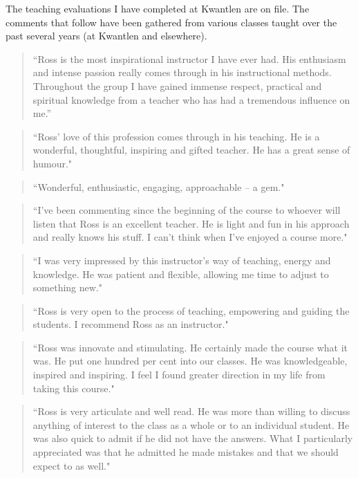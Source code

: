 \documentclass[10pt,DIV09,letterpaper,oneside,headsepline]{scrreprt}
\begin{document}
The teaching evaluations I have completed at Kwantlen are on file. The comments that follow have been gathered from various classes taught over the past several years (at Kwantlen and elsewhere).

\begin{quote}``Ross is the most inspirational instructor I have ever had. His enthusiasm and intense passion really comes through in his instructional methods. Throughout the group I have gained immense respect, practical and spiritual knowledge from a teacher who has had a tremendous influence on me.'' \end{quote}


\begin{quote} ``Ross' love of this profession comes through in his teaching. He is a wonderful, thoughtful, inspiring and gifted teacher. He has a great sense of humour." \end{quote}

\begin{quote} ``Wonderful, enthusiastic, engaging, approachable -- a gem." \end{quote}

\begin{quote} ``I've been commenting since the beginning of the course to whoever will listen that Ross is an excellent teacher. He is light and fun in his approach and really knows his stuff. I can't think when I've enjoyed a course more." \end{quote}

\begin{quote} ``I was very impressed by this instructor's way of teaching, energy and knowledge. He was patient and flexible, allowing me time to adjust to something new." \end{quote}

\begin{quote} ``Ross is very open to the process of teaching, empowering and guiding the students. I recommend Ross as an instructor." \end{quote}

\begin{quote} ``Ross was innovate and stimulating. He certainly made the course what it was. He put one hundred per cent into our classes. He was knowledgeable, inspired and inspiring. I feel I found greater direction in my life from taking this course." \end{quote}

\begin{quote} ``Ross is very articulate and well read. He was more than willing to discuss anything of interest to the class as a whole or to an individual student. He was also quick to admit if he did not have the answers. What I particularly appreciated was that he admitted he made mistakes and that we should expect to as well." \end{quote}
\end{document}
